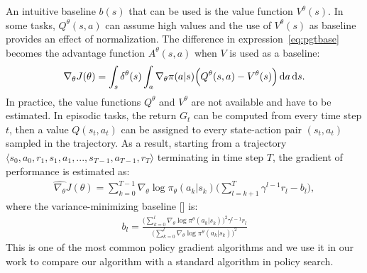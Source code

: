 An intuitive baseline $b(s)$ that can be used is the value function $V^{\theta}(s)$. In some tasks, $Q^{\theta}(s,a)$ can assume high values and the use of $V^{\theta}(s)$ as baseline provides an effect of normalization. The difference in expression~\eqref{eq:pgtbase} becomes the advantage function $A^{\theta}(s,a)$ when $V$ is used as a baseline:
\begin{align} \nabla_{\theta}J(\theta) = \int_s \delta^{\theta}(s) \int_a \nabla_{\theta} \pi(a|s) \Big( Q^{\theta}(s,a) - V^{\theta}(s) \Big) \,\mathrm{d} a \,\mathrm{d} s.\end{align}
In practice, the value functions $Q^{\theta}$ and $V^{\theta}$ are not available and have to be estimated. In episodic tasks, the return $G_t$ can be computed from every time step $t$, then a value $Q(s_t, a_t)$ can be assigned to every state-action pair $(s_t, a_t)$ sampled in the trajectory. As a result, starting from a trajectory $\langle s_0, a_0, r_1, s_1, a_1, ..., s_{T-1}, a_{T-1}, r_{T} \rangle$ terminating in time step $T$, the gradient of performance is estimated as:
\begin{align}
\widehat{\nabla_{\theta}}J(\theta) = \sum_{k=0}^{T-1} \nabla_{\theta}\log\pi_{\theta}(a_k|s_k)\Big(\sum_{l=k+1}^{T}\gamma^{l-1}r_{l} - b_{l} \Big),
\end{align}
where the variance-minimizing baseline [\cite{Peters2008ReinforcementLO}] is: 
\begin{align} b_l = \frac{\Big( \sum_{k=0}^{l}\nabla_{\theta} \log\pi^{\theta}(a_k|s_k)\Big)^2 \gamma^{l-1}r_l} {\Big( \sum_{k=0}^{l}\nabla_{\theta} \log\pi^{\theta}(a_k|s_k)\Big)^2}
\end{align} 
This is one of the most common policy gradient algorithms and we use it in our work to compare our algorithm with a standard algorithm in policy search.

